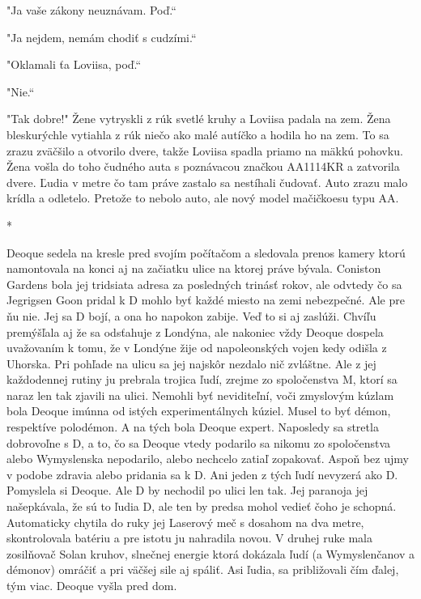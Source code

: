 \documentclass{book}
\begin{document}
"Ja vaše zákony neuznávam. Poď.“

"Ja nejdem, nemám chodiť s cudzími.“

"$ $Oklamali ťa Loviisa, poď.“

"Nie.“

"Tak dobre!"$ $ Žene vytryskli z rúk svetlé kruhy a Loviisa padala na zem. Žena bleskurýchle vytiahla z rúk niečo ako malé autíčko a hodila ho na zem. To sa zrazu zväčšilo a otvorilo dvere, takže Loviisa spadla priamo na mäkkú pohovku. Žena vošla do toho čudného auta s poznávacou značkou AA1114KR a zatvorila dvere. Ľudia v metre čo tam práve zastalo sa nestíhali čudovať. Auto zrazu malo krídla a odletelo. Pretože to nebolo auto, ale nový model mačičkoesu typu AA.

\begin{center}
*
\end{center}

Deoque sedela na kresle pred svojím počítačom a sledovala prenos kamery ktorú namontovala na konci aj na začiatku ulice na ktorej práve bývala. Coniston Gardens bola jej tridsiata adresa za posledných trinásť rokov, ale odvtedy čo sa Jegrigsen Goon pridal k D mohlo byť každé miesto na zemi nebezpečné. Ale pre ňu nie. Jej sa D bojí, a ona ho napokon zabije. Veď to si aj zaslúži. Chvíľu premýšľala aj že sa odsťahuje z Londýna, ale nakoniec vždy Deoque dospela uvažovaním k tomu, že v Londýne žije od napoleonských vojen kedy odišla z Uhorska. Pri pohľade na ulicu sa jej najskôr nezdalo nič zvláštne. Ale z jej každodennej rutiny ju prebrala trojica ľudí, zrejme zo spoločenstva M, ktorí sa naraz len tak zjavili na ulici. Nemohli byť neviditeľní, voči zmyslovým kúzlam bola Deoque imúnna od istých experimentálnych kúziel. Musel to byť démon, respektíve polodémon. A na tých bola Deoque expert. Naposledy sa stretla dobrovoľne s D, a to, čo sa Deoque vtedy podarilo sa nikomu zo spoločenstva alebo Wymyslenska nepodarilo, alebo nechcelo zatiaľ zopakovať. Aspoň bez ujmy v podobe zdravia alebo pridania sa k D. Ani jeden z tých ľudí nevyzerá ako D. Pomyslela si Deoque. Ale D by nechodil po ulici len tak. Jej paranoja jej našepkávala, že sú to ľudia D, ale ten by predsa mohol vedieť čoho je schopná. Automaticky chytila do ruky jej Laserový meč s dosahom na dva metre, skontrolovala batériu a pre istotu ju nahradila novou. V druhej ruke mala zosilňovač Solan kruhov, slnečnej energie ktorá dokázala ľudí (a Wymyslenčanov a démonov) omráčiť a pri väčšej sile aj spáliť. Asi ľudia, sa približovali čím ďalej, tým viac. Deoque vyšla pred dom.
\end{document}
